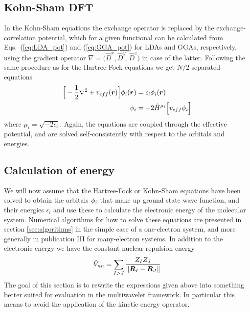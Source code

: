 \subsection{Kohn-Sham DFT}
In the Kohn-Sham equations the exchange operator is replaced by the exchange-correlation 
potential, which for a given functional can be calculated from Eqs.~(\ref{eq:LDA_pot}) and 
(\ref{eq:GGA_pot}) for LDAs and GGAs, respectively, using the gradient operator 
$\nabla=\big(\hat{D}^x,\hat{D}^y,\hat{D}^z\big)$ in case of the latter. Following the same 
procedure as for the Hartree-Fock equations we get $N/2$ separated equations
\begin{align}
    \Big[-\frac{1}{2}\nabla^2+v_{eff}(\boldsymbol r)\Big]\phi_i(\boldsymbol r) 
	    &=\epsilon_i \phi_i(\boldsymbol r)\\
    \phi_i &= -2\hat{H}^{\mu_i}\Big[v_{eff} \phi_i \Big] 
\end{align}
where $\mu_i = \sqrt{-2\epsilon_i}$. Again, the equations are coupled through the effective 
potential, and are solved self-consistently with respect to the orbitals and energies.

\subsection{Calculation of energy}
We will now assume that the Hartree-Fock or Kohn-Sham equations have been solved to obtain
the orbitals $\phi_i$ that make up ground state wave function, and their energies 
$\epsilon_i$ and use these to calculate the electronic energy of the molecular system.
Numerical algorithms for how to solve these equations are presented in section 
\ref{sec:algorithms} in the simple case of a one-electron system, and more generally in
publication III for many-electron systems. In addition to the electronic energy we have 
the constant nuclear repulsion energy
\begin{equation}
    \hat{V}_{nn} = \sum_{I>J} \frac{Z_IZ_J}{\|\boldsymbol R_I-\boldsymbol R_J\|}
\end{equation}
The goal of this section is to rewrite the expressions given above into something better 
suited for evaluation in the multiwavelet framework. In particular this means to avoid
the application of the kinetic energy operator.

